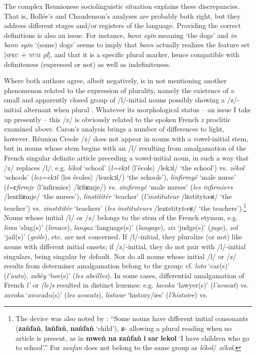 \documentclass[output=paper]{langscibook}
\begin{document}
The complex Reunionese sociolinguistic situation explains these discrepancies. That is, Bollée’s and Chaudenson’s analyses are probably both right, but they address different stages and/or registers of the language. Providing the correct definitions is also an issue. For instance, \textit{bann syin} meaning ‘the dogs’ and \textit{in bann syin} ‘(some) dogs’ seems to imply that \textit{bann} actually realizes the feature set [\textsc{spec} + \textsc{num} \textit{pl}], and that it is a specific plural marker, hence compatible with definiteness (expressed or not) as well as indefiniteness.

Where both authors agree, albeit negatively, is in not mentioning another phenomenon related to the expression of plurality, namely the existence of a small and apparently closed group of /l/-initial nouns possibly showing a /z/-initial alternant when plural \citep[68--69]{Caron2011}. Whatever its morphological status -- an issue I take up presently -- this /z/ is obviously related to the spoken French \textit{z} proclitic examined above. Caron’s analysis brings a number of differences to light, however. Réunion Creole /z/ does not appear in nouns with a vowel-initial stem, but in nouns whose stem begins with an /l/ resulting from amalgamation of the French singular definite article preceding a vowel-initial noun, in such a way that /z/ replaces /l/: e.g. \textit{lékol} ‘school’ (\textit{l=ekɔl} 〈l’école〉 /lekɔl/ ‘the school’) vs. \textit{zékol} ‘schools’ (\textit{lez=ekɔl} 〈les écoles〉 /lezekɔl/) ‘the schools’), \textit{linfirmyé} ‘male nurse’ (\textit{l=ɛfirmje} 〈l’infirmier〉 /lɛfiʁmje/) vs. \textit{zinfirmyé} ‘male nurses’ (\textit{les infirmiers} /lezɛfiʁmje/ ‘the nurses’), \textit{linstititér} ‘teacher’ (\textit{l’instituteur} /lɛstitytœʁ/ ‘the teacher’) vs. \textit{zinstititér} ‘teachers’ (\textit{les instituteurs} /lezɛstitytœʁ/ ‘the teachers’).\footnote{The device was also noted by \citet[78]{Corne1999}: “Some nouns have different initial consonants (\textbf{zaṅfaṅ}, \textbf{laṅfaṅ}, \textbf{naṅfaṅ} ‘child’), \textbf{z}{}- allowing a plural reading when no article is present, as in \textbf{mweṅ} \textbf{na} \textbf{zaṅfaṅ} \textbf{i} \textbf{sar} \textbf{lekol} ‘I have children who go to school’.” For \citet{Caron2011} \textit{zanfan} does not belong to the same group as \textit{lékol}/ \textit{zékol}.} Nouns whose initial /l/ or /z/ belongs to the stem of the French etymon, e.g. \textit{lima} ‘slug(s)’ (\textit{limace}), \textit{langaz} ‘language(s)’ (\textit{langage}), \textit{ziz} ‘judge(s)’ (\textit{juge}), \textit{zol} ‘jail(s)’ (\textit{geôle}), etc. are not concerned. If /l/-initial, they pluralize (or not) like nouns with different initial onsets; if /z/-initial, they do not pair with /l/-initial singulars, being singular by default. Nor do all nouns whose initial /l/ or /z/ results from determiner amalgamation belong to the group: cf. \textit{loto} ‘car(s)’ (\textit{l’auto}), \textit{zabèy} ‘bee(s)’ (\textit{les abeilles}). In some cases, differential amalgamation of French \textit{l’} or \textit{(le)s} resulted in distinct lexemes: e.g. \textit{lavoka} ‘lawyer(s)’ (\textit{l’avocat}) vs. \textit{zavoka} ‘avocado(s)’ (\textit{les avocats}), \textit{listwar} ‘history/ies’ (\textit{l’histoire}) vs. 
\end{document}
